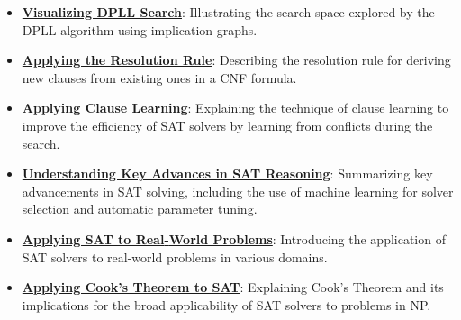 \documentclass{article}%
\begin{document}
\begin{itemize}[leftmargin=*]
\item \href{https://purdue.brightspace.com/d2l/common/assets/pdfjs-d2l-dist/1.0.14-legacy/web/viewer.html?file=%2Fcontent%2Fenforced%2F1095467-wl.202510.CS.24300.001%2F15L2-SAT.pdf%3Fou%3D1095467&lang=en-us&container=d2l-fileviewer-rendered-pdf&fullscreen=d2l-fileviewer-rendered-pdf-dialog&height=667#page=22}{\textbf{Visualizing DPLL Search}}: Illustrating the search space explored by the DPLL algorithm using implication graphs.%
\item \href{https://purdue.brightspace.com/d2l/common/assets/pdfjs-d2l-dist/1.0.14-legacy/web/viewer.html?file=%2Fcontent%2Fenforced%2F1095467-wl.202510.CS.24300.001%2F15L2-SAT.pdf%3Fou%3D1095467&lang=en-us&container=d2l-fileviewer-rendered-pdf&fullscreen=d2l-fileviewer-rendered-pdf-dialog&height=667#page=32}{\textbf{Applying the Resolution Rule}}: Describing the resolution rule for deriving new clauses from existing ones in a CNF formula.%
\item \href{https://purdue.brightspace.com/d2l/common/assets/pdfjs-d2l-dist/1.0.14-legacy/web/viewer.html?file=%2Fcontent%2Fenforced%2F1095467-wl.202510.CS.24300.001%2F15L2-SAT.pdf%3Fou%3D1095467&lang=en-us&container=d2l-fileviewer-rendered-pdf&fullscreen=d2l-fileviewer-rendered-pdf-dialog&height=667#page=34}{\textbf{Applying Clause Learning}}: Explaining the technique of clause learning to improve the efficiency of SAT solvers by learning from conflicts during the search.%
\item \href{https://purdue.brightspace.com/d2l/common/assets/pdfjs-d2l-dist/1.0.14-legacy/web/viewer.html?file=%2Fcontent%2Fenforced%2F1095467-wl.202510.CS.24300.001%2F15L2-SAT.pdf%3Fou%3D1095467&lang=en-us&container=d2l-fileviewer-rendered-pdf&fullscreen=d2l-fileviewer-rendered-pdf-dialog&height=667#page=35}{\textbf{Understanding Key Advances in SAT Reasoning}}: Summarizing key advancements in SAT solving, including the use of machine learning for solver selection and automatic parameter tuning.%
\item \href{https://purdue.brightspace.com/d2l/common/assets/pdfjs-d2l-dist/1.0.14-legacy/web/viewer.html?file=%2Fcontent%2Fenforced%2F1095467-wl.202510.CS.24300.001%2F15L2-SAT.pdf%3Fou%3D1095467&lang=en-us&container=d2l-fileviewer-rendered-pdf&fullscreen=d2l-fileviewer-rendered-pdf-dialog&height=667#page=37}{\textbf{Applying SAT to Real{-}World Problems}}: Introducing the application of SAT solvers to real-world problems in various domains.%
\item \href{https://purdue.brightspace.com/d2l/common/assets/pdfjs-d2l-dist/1.0.14-legacy/web/viewer.html?file=%2Fcontent%2Fenforced%2F1095467-wl.202510.CS.24300.001%2F15L2-SAT.pdf%3Fou%3D1095467&lang=en-us&container=d2l-fileviewer-rendered-pdf&fullscreen=d2l-fileviewer-rendered-pdf-dialog&height=667#page=54}{\textbf{Applying Cook's Theorem to SAT}}: Explaining Cook's Theorem and its implications for the broad applicability of SAT solvers to problems in NP.%

\end{itemize}
\end{document}
